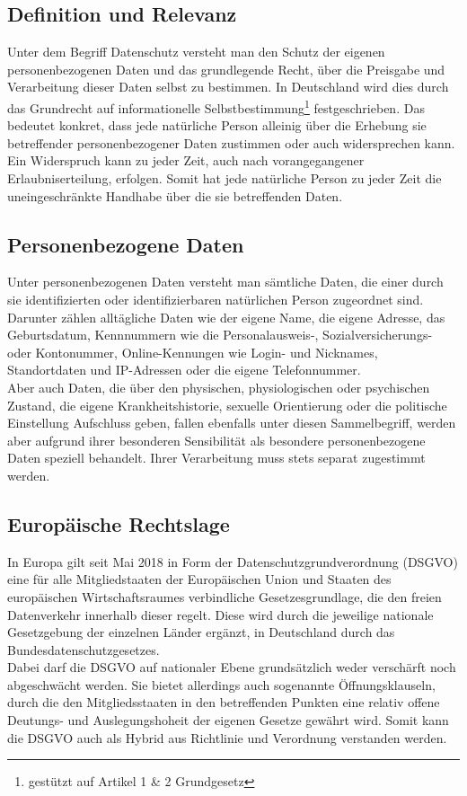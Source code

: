 \subsection{Definition und Relevanz}
    Unter dem Begriff Datenschutz versteht man den Schutz der eigenen personenbezogenen Daten und das grundlegende Recht, über die Preisgabe und Verarbeitung dieser Daten selbst zu bestimmen. In Deutschland wird dies durch das Grundrecht auf informationelle Selbstbestimmung\footnote{gestützt auf Artikel 1 \& 2 Grundgesetz} festgeschrieben. Das bedeutet konkret, dass jede natürliche Person alleinig über die Erhebung sie betreffender personenbezogener Daten zustimmen oder auch widersprechen kann. Ein Widerspruch kann zu jeder Zeit, auch nach vorangegangener Erlaubniserteilung, erfolgen. Somit hat jede natürliche Person zu jeder Zeit die uneingeschränkte Handhabe über die sie betreffenden Daten.

\subsection{Personenbezogene Daten}
    Unter personenbezogenen Daten versteht man sämtliche Daten, die einer durch sie identifizierten oder identifizierbaren natürlichen Person zugeordnet sind. Darunter zählen alltägliche Daten wie der eigene Name, die eigene Adresse, das Geburtsdatum, Kennnummern wie die Personalausweis-, Sozialversicherungs- oder Kontonummer, Online-Kennungen wie Login- und Nicknames, Standortdaten und IP-Adressen oder die eigene Telefonnummer.\\
    Aber auch Daten, die über den physischen, physiologischen oder psychischen Zustand, die eigene Krankheitshistorie, sexuelle Orientierung oder die politische Einstellung Aufschluss geben, fallen ebenfalls unter diesen Sammelbegriff, werden aber aufgrund ihrer besonderen Sensibilität als \glqq besondere personenbezogene Daten\grqq{} speziell behandelt. Ihrer Verarbeitung muss stets separat zugestimmt werden.

\subsection{Europäische Rechtslage}
    In Europa gilt seit Mai 2018 in Form der \glqq Datenschutzgrundverordnung\grqq{} (DSGVO) eine für alle Mitgliedstaaten der Europäischen Union und Staaten des europäischen Wirtschaftsraumes verbindliche Gesetzesgrundlage, die den freien Datenverkehr innerhalb dieser regelt. Diese wird durch die jeweilige nationale Gesetzgebung der einzelnen Länder ergänzt, in Deutschland durch das Bundesdatenschutzgesetzes.\\
    Dabei darf die DSGVO auf nationaler Ebene grundsätzlich weder verschärft noch abgeschwächt werden. Sie bietet allerdings auch sogenannte Öffnungsklauseln, durch die den Mitgliedsstaaten in den betreffenden Punkten eine relativ offene Deutungs- und Auslegungshoheit der eigenen Gesetze gewährt wird. Somit kann die DSGVO auch als Hybrid aus Richtlinie und Verordnung verstanden werden.\\

